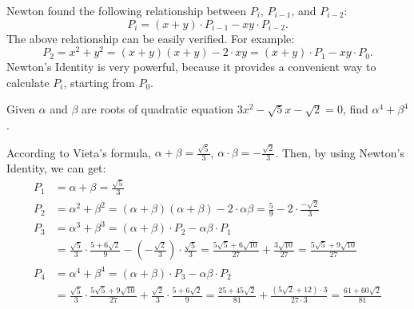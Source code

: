 \documentclass[11pt, oneside]{article}   	%
\begin{document}
Newton found the following relationship between $P_i$,  $P_{i-1}$,  and $P_{i-2}$: 
\[ P_i=(x+y)\cdot P_{i-1}-xy\cdot P_{i-2}. \]
The above relationship can be easily verified. For example: 
\[P_2=x^2+y^2=(x+y)(x+y)-2 \cdot xy = (x+y)\cdot P_1- xy \cdot P_0. \]
Newton's Identity is very powerful, because it provides a convenient way to calculate $P_i$, starting from $P_0$. 

Given $\alpha$ and $\beta$ are roots of quadratic equation $3x^2-\sqrt{5}x-\sqrt{2}=0$, find $\alpha^4 + \beta^4$. 

According to Vieta's formula, $\alpha+\beta = \frac{\sqrt{5}}{3}$, $\alpha \cdot \beta = -\frac{\sqrt{2}}{3}$. 
Then, by using Newton's Identity, we can get: 
\begin{align*} 
P_1& = \alpha+\beta = \frac{\sqrt{5}}{3} \\
P_2 &= \alpha^2 + \beta^2 = (\alpha+\beta)(\alpha+\beta) - 2\cdot \alpha\beta=\frac{5}{9}-2 \cdot \frac{-\sqrt{2}}{3}\\
P_3 &= \alpha^3 + \beta^3 = (\alpha + \beta)\cdot P_2 -\alpha \beta \cdot P_1\\
& = \frac{\sqrt{5}}{3} \cdot \frac{5+6\sqrt{2}}{9} - (-\frac{\sqrt{2}}{3}) \cdot \frac{\sqrt{5}}{3} = \frac{5\sqrt{5} + 6 \sqrt{10}}{27} +\frac{3\sqrt{10}}{27} = \frac{5\sqrt{5} + 9 \sqrt{10}}{27}\\
P_4 & = \alpha^4+\beta^4 = (\alpha + \beta)\cdot P_3 -\alpha \beta \cdot P_2 \\
&= \frac{\sqrt{5}}{3} \cdot \frac{5\sqrt{5}+9\sqrt{10}}{27} + \frac{\sqrt{2}}{3} \cdot \frac{5+6\sqrt{2}}{9} = \frac{25+45\sqrt{2}}{81} + \frac{(5 \sqrt{2} + 12) \cdot 3}{27 \cdot 3} = \frac{61+60\sqrt{2}}{81} 
\end{align*}

\newpage
\end{document}
